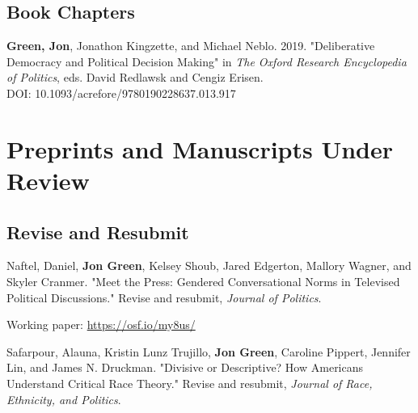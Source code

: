 \documentclass[letterpaper]{article}
\renewenvironment{itemize}{
  \begin{list}{}{
    \setlength{\leftmargin}{1.5em}
  }
}{
  \end{list}
}
\begin{document}
\subsection*{Book Chapters}

\begin{etaremune}
\item \textbf{Green, Jon}, Jonathon Kingzette, and Michael Neblo. 2019. "Deliberative Democracy and Political Decision Making" in \textit{The Oxford Research Encyclopedia of Politics}, eds. David Redlawsk and Cengiz Erisen.\\
DOI: 10.1093/acrefore/9780190228637.013.917
\end{etaremune}

\section*{Preprints and Manuscripts Under Review}

\subsection*{Revise and Resubmit}


\begin{itemize}

\item Naftel, Daniel, \textbf{Jon Green}, Kelsey Shoub, Jared Edgerton, Mallory Wagner, and Skyler Cranmer. "Meet the Press: Gendered Conversational Norms in Televised Political Discussions."  Revise and resubmit, \textit{Journal of Politics}.
\begin{itemize}
\item Working paper: \url{https://osf.io/my8us/}
\end{itemize}

\item Safarpour, Alauna, Kristin Lunz Trujillo, \textbf{Jon Green}, Caroline Pippert, Jennifer Lin, and James N. Druckman. "Divisive or Descriptive? How Americans Understand Critical Race Theory." Revise and resubmit, \textit{Journal of Race, Ethnicity, and Politics}.
\end{itemize}
\end{document}

